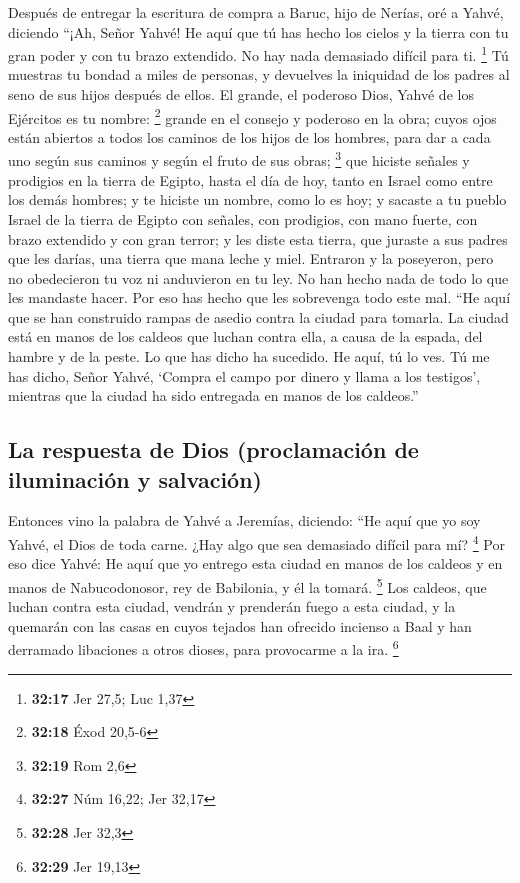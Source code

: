  Después de entregar la escritura de compra a Baruc, hijo
de Nerías, oré a Yahvé, diciendo  ``¡Ah, Señor Yahvé! He
aquí que tú has hecho los cielos y la tierra con tu gran poder y con tu
brazo extendido. No hay nada demasiado difícil para ti. \footnote{\textbf{32:17}
  Jer 27,5; Luc 1,37}  Tú muestras tu bondad a miles de
personas, y devuelves la iniquidad de los padres al seno de sus hijos
después de ellos. El grande, el poderoso Dios, Yahvé de los Ejércitos es
tu nombre: \footnote{\textbf{32:18} Éxod 20,5-6}  grande
en el consejo y poderoso en la obra; cuyos ojos están abiertos a todos
los caminos de los hijos de los hombres, para dar a cada uno según sus
caminos y según el fruto de sus obras; \footnote{\textbf{32:19} Rom 2,6}
 que hiciste señales y prodigios en la tierra de Egipto,
hasta el día de hoy, tanto en Israel como entre los demás hombres; y te
hiciste un nombre, como lo es hoy;  y sacaste a tu pueblo
Israel de la tierra de Egipto con señales, con prodigios, con mano
fuerte, con brazo extendido y con gran terror;  y les
diste esta tierra, que juraste a sus padres que les darías, una tierra
que mana leche y miel.  Entraron y la poseyeron, pero no
obedecieron tu voz ni anduvieron en tu ley. No han hecho nada de todo lo
que les mandaste hacer. Por eso has hecho que les sobrevenga todo este
mal.  ``He aquí que se han construido rampas de asedio
contra la ciudad para tomarla. La ciudad está en manos de los caldeos
que luchan contra ella, a causa de la espada, del hambre y de la peste.
Lo que has dicho ha sucedido. He aquí, tú lo ves.  Tú me
has dicho, Señor Yahvé, `Compra el campo por dinero y llama a los
testigos', mientras que la ciudad ha sido entregada en manos de los
caldeos.''

\hypertarget{la-respuesta-de-dios-proclamaciuxf3n-de-iluminaciuxf3n-y-salvaciuxf3n}{%
\subsection{La respuesta de Dios (proclamación de iluminación y
salvación)}\label{la-respuesta-de-dios-proclamaciuxf3n-de-iluminaciuxf3n-y-salvaciuxf3n}}

 Entonces vino la palabra de Yahvé a Jeremías, diciendo:
 ``He aquí que yo soy Yahvé, el Dios de toda carne. ¿Hay
algo que sea demasiado difícil para mí? \footnote{\textbf{32:27} Núm
  16,22; Jer 32,17}  Por eso dice Yahvé: He aquí que yo
entrego esta ciudad en manos de los caldeos y en manos de Nabucodonosor,
rey de Babilonia, y él la tomará. \footnote{\textbf{32:28} Jer 32,3}
 Los caldeos, que luchan contra esta ciudad, vendrán y
prenderán fuego a esta ciudad, y la quemarán con las casas en cuyos
tejados han ofrecido incienso a Baal y han derramado libaciones a otros
dioses, para provocarme a la ira. \footnote{\textbf{32:29} Jer 19,13}

